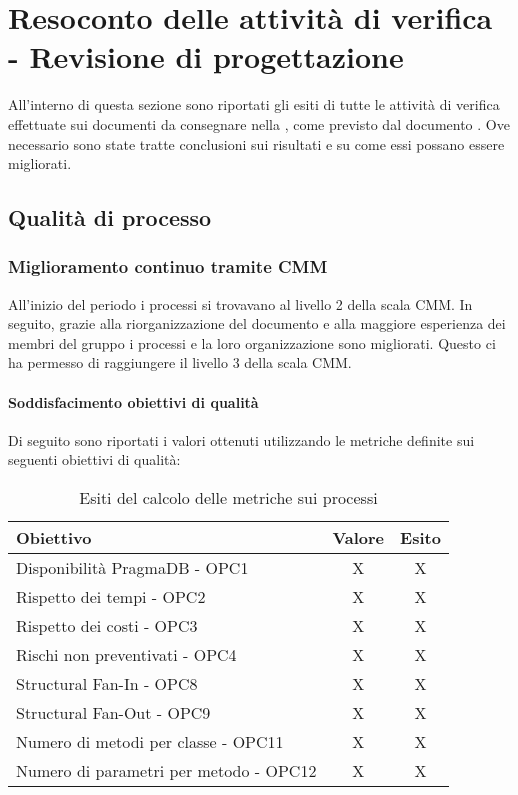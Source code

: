 \documentclass[PdQ.tex]{subfiles}
\begin{document}
\section{Resoconto delle attività di verifica - Revisione di progettazione}
All'interno di questa sezione sono riportati gli esiti di tutte le attività di verifica effettuate sui documenti da consegnare nella \RP{}, come previsto dal documento \PPdocRP{}. Ove necessario sono state tratte conclusioni sui risultati e su come essi possano essere migliorati.

\subsection{Qualità di processo}
		\subsubsection{Miglioramento continuo tramite CMM}
	
		All'inizio del periodo i processi si trovavano al livello 2 della scala CMM. In seguito, grazie alla riorganizzazione del documento \NPdocRP{} e alla maggiore esperienza dei membri del gruppo i processi e la loro organizzazione sono migliorati. Questo ci ha permesso di raggiungere il livello 3 della scala CMM. 

		\paragraph{Soddisfacimento obiettivi di qualità}
			Di seguito sono riportati i valori ottenuti utilizzando le metriche definite sui seguenti obiettivi di qualità:
			\begin{table}[h]
				\centering
				\begin{tabular}{l c c}
					\hline
					\rule[-0.3cm]{0cm}{0.8cm}
					\textbf{Obiettivo} & \textbf{Valore} & \textbf{Esito} \\
					\hline
					\rule[0cm]{0cm}{0.4cm}
					Disponibilità PragmaDB - OPC1 & X & X \\
					\rule[0cm]{0cm}{0.4cm}
					Rispetto dei tempi - OPC2 & X & X \\
					\rule[0cm]{0cm}{0.4cm}
					Rispetto dei costi - OPC3 & X & X\\ 
					\rule[0cm]{0cm}{0.4cm}
					Rischi non preventivati - OPC4 & X & X\\ 
					\rule[0cm]{0cm}{0.4cm}
					Structural Fan-In - OPC8 & X & X\\ 
					\rule[0cm]{0cm}{0.4cm}
					Structural Fan-Out - OPC9 & X & X\\ 
					\rule[0cm]{0cm}{0.4cm}
					Numero di metodi per classe - OPC11 & X & X\\ 
					\rule[0cm]{0cm}{0.4cm}
					Numero di parametri per metodo - OPC12 & X & X\\ 
					\hline
				\end{tabular}
				\caption{Esiti del calcolo delle metriche sui processi}
			\end{table}
		
\end{document}
